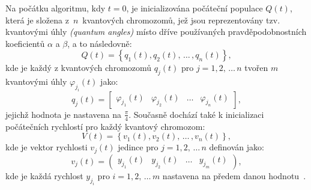 Na počátku algoritmu, kdy $t=0$, je inicializována počáteční populace $Q\left(t\right)$, která je složena z~$n$~kvantových chromozomů, jež jsou reprezentovány tzv. kvantovými úhly \emph{(quantum angles)} místo dříve používaných pravděpodobnostních koeficientů $\alpha$ a $\beta$, a to následovně:
\begin{equation*}
    Q\left(t\right) = \left\{q_1\left(t\right), q_2\left(t\right),\,\dots\,,q_n\left(t\right)\right\},
\end{equation*}
kde je každý z kvantových chromozomů $q_j\left(t\right)$ pro $j=1,2,\,\dots\,n$ tvořen $m$ kvantovými úhly $\varphi_{j_i}\left(t\right)$ jako:
\begin{equation*}
    q_j\left(t\right) = \begin{bmatrix} \varphi_{j_1}\left(t\right) & \varphi_{j_2}\left(t\right) & \dots & \varphi_{j_n}\left(t\right) \end{bmatrix},
\end{equation*}
jejichž hodnota je nastavena na $\frac{\pi}{4}$.
Současně dochází také k inicializaci počátečních rychlostí pro každý kvantový chromozom:
\begin{equation*}
    V\left(t\right) = \left\{ v_1\left(t\right), v_2\left(t\right) ,\,\dots\,, v_n\left(t\right)\right\},
\end{equation*}
kde je vektor rychlosti $v_j\left(t\right)$ jedince pro $j=1,2,\,\dots\,n$ definován jako:
\begin{equation*}
    v_j\left(t\right) = \begin{pmatrix} y_{j_1}\left(t\right) & y_{j_2}\left(t\right) & \dots & y_{j_m}\left(t\right) \end{pmatrix},
\end{equation*}
kde je každá rychlost $y_{j_i}$ pro $i=1,2,\,\dots\,m$ nastavena na předem danou hodnotu~\cite{qse}.

